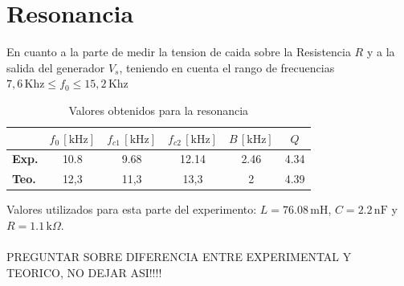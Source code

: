 \section{Resonancia}
En cuanto a la parte de medir la tension de caida sobre la Resistencia $R$ y a la salida del generador $V_s$, teniendo en cuenta el rango de frecuencias $7,6\,\text{Khz} \leq f_0 \leq 15,2\,\text{Khz}$

\begin{table}[H]
\centering
\caption{Valores obtenidos para la resonancia}
\label{tab:parte2_tp4_traspuesta}
\begin{tabular}{lccccc}
\toprule
\textbf{} & $f_{0}\,[\text{kHz}]$ & $f_{c1}\,[\text{kHz}]$ & $f_{c2}\,[\text{kHz}]$ & $B\,[\text{kHz}]$ & $Q$ \\
\midrule
\textbf{Exp.} & 10.8 & 9.68 & 12.14 & 2.46 & 4.34 \\
\textbf{Teo.} & 12,3   & 11,3   & 13,3    & 2   & 4.39 \\
\bottomrule
\end{tabular}
\end{table}
Valores utilizados para esta parte del experimento: \(L = 76.08\,\text{mH}\), \(C = 2.2\,\text{nF}\) y \(R = 1.1\,\text{k}\Omega\).
\\
\\
PREGUNTAR SOBRE DIFERENCIA ENTRE EXPERIMENTAL Y TEORICO, NO DEJAR ASI!!!!


\newpage